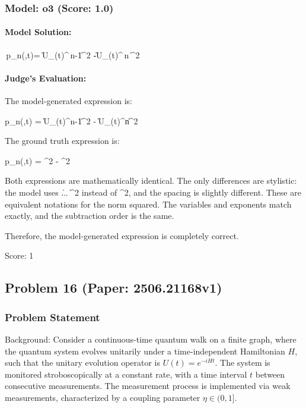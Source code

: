 \documentclass[10pt]{article}
\begin{document}
\subsubsection*{Model: o3 (Score: 1.0)}
\paragraph*{Model Solution:}
\,p_n(\eta ,t)=
      \bigl\|\tilde U_{\eta}(t)^{\,n-1}\ket{\psi }\bigr\|^{2}
      -\bigl\|\tilde U_{\eta}(t)^{\,n }\ket{\psi }\bigr\|^{2}\;

\paragraph*{Judge's Evaluation:}

The model-generated expression is:

p_n(\eta ,t) = \|\tilde U_{\eta}(t)^{n-1}\ket{\psi}\|^{2} - \|\tilde U_{\eta}(t)^{n}\ket{\psi}\|^{2}

The ground truth expression is:

p_n(\eta,t) = ^2 - ^2

Both expressions are mathematically identical. The only differences are stylistic: the model uses \bigl\| ... \bigr\|^{2} instead of ^2, and the spacing is slightly different. These are equivalent notations for the norm squared. The variables and exponents match exactly, and the subtraction order is the same.

Therefore, the model-generated expression is completely correct.

Score: 1

\newpage
\subsection*{Problem 16 (Paper: 2506.21168v1)}
\subsubsection*{Problem Statement}
Background:
Consider a continuous-time quantum walk on a finite graph, where the quantum system evolves unitarily under a time-independent Hamiltonian $H$, such that the unitary evolution operator is $U(t)=e^{-iHt}$. The system is monitored stroboscopically at a constant rate, with a time interval $t$ between consecutive measurements. The measurement process is implemented via weak measurements, characterized by a coupling parameter $\eta \in (0,1]$.
\end{document}
